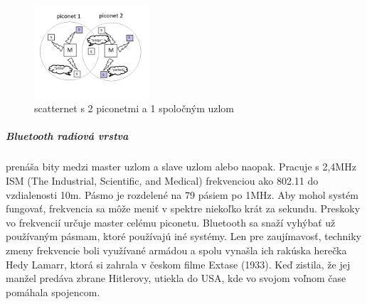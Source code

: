 \documentclass[../../main.tex]{subfiles}
\begin{document}
 \begin{figure}
 \centering
  \includegraphics[width=0.38\textwidth]{images/scatternet.png}
  \caption{scatternet s 2 piconetmi a 1 spoločným uzlom\cite{tanenbaum}}
    \label{fig:scatternet}
 \end{figure}

\subparagraph{Bluetooth radiová vrstva} prenáša bity medzi master uzlom a slave uzlom alebo naopak. Pracuje s  2,4MHz ISM (The Industrial, Scientific, and Medical) frekvenciou ako 802.11 do vzdialenosti 10m. Pásmo je rozdelené na 79 pásiem po 1MHz. Aby mohol systém fungovať, frekvencia sa môže meniť v spektre niekoľko krát za sekundu. Preskoky vo frekvencií určuje master celému piconetu. Bluetooth sa snaží vyhýbať už používaným pásmam, ktoré používajú iné systémy. Len pre zaujímavosť, techniky zmeny frekvencie boli využívané armádou a spolu vynašla ich rakúska herečka Hedy Lamarr, ktorá si zahrala v českom filme Extase (1933). Keď zistila, že jej manžel predáva zbrane Hitlerovy, utiekla do USA, kde vo svojom voľnom čase pomáhala spojencom\cite{tanenbaum}.
\end{document}
